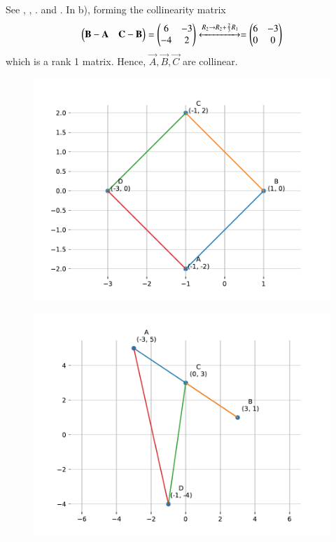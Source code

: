 	See ,
	, .
	and 
	. 
In b), forming the collinearity matrix
\begin{align}
\begin{pmatrix}\mathbf{B}-\mathbf{A} & \mathbf{C}-\mathbf{B}\end{pmatrix} 
=
		\begin{pmatrix}6&-3\\-4&2\end{pmatrix} \xleftrightarrow{R_{2}\rightarrow R_{2}+\frac{2}{3}R_{1}}= \begin{pmatrix}6&-3\\0&0\end{pmatrix}
\end{align}
which is a rank 1 matrix.  Hence, $\vec{A}, \vec{B}, \vec{C}$  are collinear.
\begin{figure}[H]
	\begin{center} 
	    \includegraphics[width=0.75\columnwidth]{chapters/10/7/1/6/figs/fig1.pdf}
	\end{center}
\caption{}
\label{fig:10/7/1/6/Fig1}
\end{figure}
%
\begin{figure}[H]
	\begin{center} 
	    \includegraphics[width=0.75\columnwidth]{chapters/10/7/1/6/figs/fig2.pdf}
	\end{center}
\caption{}
\label{fig:10/7/1/6/Fig2}
\end{figure}
